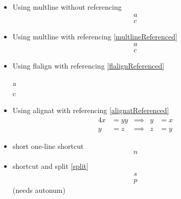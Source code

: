 \documentclass{article}
\def\ifautonum#1{#1}%
\def\ifautonum#1{}%
\begin{document}
\begin{itemize}
		\item Using multline without referencing
			\begin{multline}
				a\\
				c\label{multlineUnreferenced}
			\end{multline}
		\item Using multline with referencing \ref{multlineReferenced}
			\begin{multline}
				a\\
				c\label{multlineReferenced}
			\end{multline}
		\item Using flalign with referencing \ref{flalignReferenced}
			\begin{flalign}
				a\\
				c\label{flalignReferenced}
			\end{flalign}
		\item Using alignat with referencing \ref{alignatReferenced}
			\begin{alignat}{4}
				x &= yy & \implies & y &= x \label{alignatUnreferenced}\\
				y &= z & \implies & z &= y \label{alignatReferenced}
			\end{alignat}
		\item short one-line shortcut \[n\]
		\ifautonum{
			\item align, numbering always \begin{align+} a=l \end{align+} (needs autonum)
			\item gather, numbering always \begin{gather+} g=a \end{gather+} (needs autonum)
			\item multline, numbering always (and avoiding overfull hbox warning) \begin{multline+} m=u\line(1,0){220}=v \end{multline+} (needs autonum)
			\item equation, numbering always \begin{equation+} e=q \end{equation+} (needs autonum)
		}
		\item shortcut and split \ref{split} \[ \label{split}\begin{split} s \\ p \end{split} \] (needs autonum)

\end{itemize}
\end{document}
